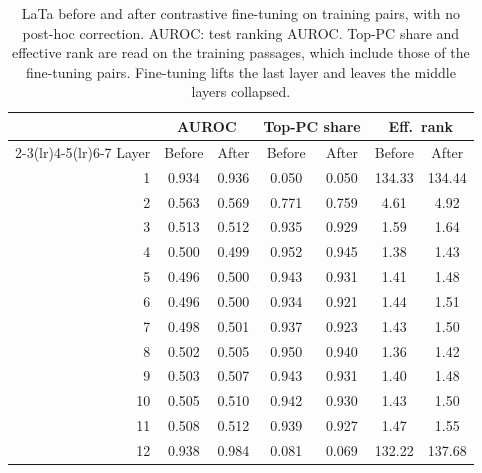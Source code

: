 \begin{table}[t]
\centering
\footnotesize
\setlength{\tabcolsep}{4pt}
\begin{tabular}{@{}rcccccc@{}}
\toprule
& \multicolumn{2}{c}{AUROC} & \multicolumn{2}{c}{Top-PC share} & \multicolumn{2}{c}{Eff.\ rank} \\
\cmidrule(lr){2-3}\cmidrule(lr){4-5}\cmidrule(lr){6-7}
Layer & Before & After & Before & After & Before & After \\
\midrule
1 & 0.934 & 0.936 & 0.050 & 0.050 & 134.33 & 134.44 \\
2 & 0.563 & 0.569 & 0.771 & 0.759 & 4.61 & 4.92 \\
3 & 0.513 & 0.512 & 0.935 & 0.929 & 1.59 & 1.64 \\
4 & 0.500 & 0.499 & 0.952 & 0.945 & 1.38 & 1.43 \\
5 & 0.496 & 0.500 & 0.943 & 0.931 & 1.41 & 1.48 \\
6 & 0.496 & 0.500 & 0.934 & 0.921 & 1.44 & 1.51 \\
7 & 0.498 & 0.501 & 0.937 & 0.923 & 1.43 & 1.50 \\
8 & 0.502 & 0.505 & 0.950 & 0.940 & 1.36 & 1.42 \\
9 & 0.503 & 0.507 & 0.943 & 0.931 & 1.40 & 1.48 \\
10 & 0.505 & 0.510 & 0.942 & 0.930 & 1.43 & 1.50 \\
11 & 0.508 & 0.512 & 0.939 & 0.927 & 1.47 & 1.55 \\
12 & 0.938 & 0.984 & 0.081 & 0.069 & 132.22 & 137.68 \\
\bottomrule
\end{tabular}
\caption{LaTa before and after contrastive fine-tuning on training pairs, with no post-hoc correction. AUROC: test ranking AUROC. Top-PC share and effective rank are read on the training passages, which include those of the fine-tuning pairs. Fine-tuning lifts the last layer and leaves the middle layers collapsed.}
\label{tab:ft_lata_layerwise}
\end{table}
